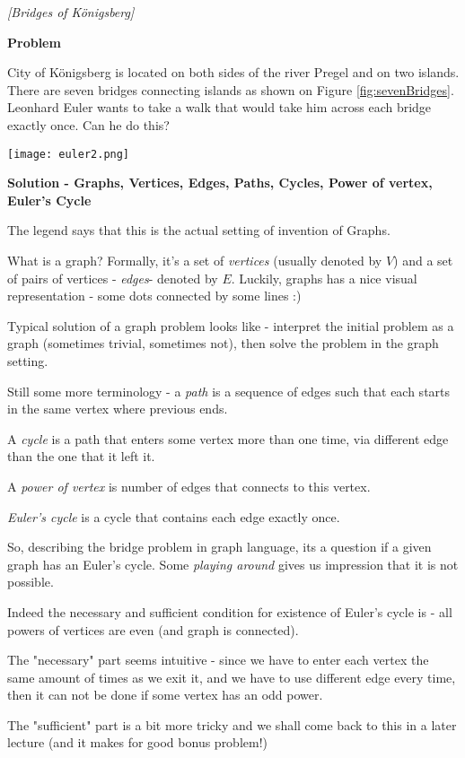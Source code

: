 

%




\noindent 
\filbreak
\begin{problem}
\textit{[Bridges of Königsberg]}

\textbf{Problem}

City of Königsberg is located on both sides of the river Pregel and on two islands. There are seven bridges connecting islands as shown on Figure \ref{fig:sevenBridges}. Leonhard Euler wants to take a walk that would take him across each bridge exactly once. Can he do this? 

\begin{center}
\texttt{[image: euler2.png]}
\label{fig:sevenBridges}
\end{center} 

\textbf{Solution - Graphs, Vertices, Edges, Paths, Cycles, Power of vertex, Euler's Cycle}

The legend says that this is the actual setting of invention of Graphs. 

What is a graph? Formally, it's a set of \textit{vertices} (usually denoted by $V$) and a set of pairs of vertices - \textit{edges}- denoted by $E$. Luckily, graphs has a nice visual representation - some dots connected by some lines :)

Typical solution of a graph problem looks like - interpret the initial problem as a graph (sometimes trivial, sometimes not), then solve the problem in the graph setting. 

Still some more terminology - a \textit{path} is a sequence of edges such that each starts in the same vertex where previous ends. 

A \textit{cycle} is a path that enters some vertex more than one time, via different edge than the one that it left it. 

A \textit{power of vertex} is number of edges that connects to this vertex.  

\textit{Euler's cycle} is a cycle that contains each edge exactly once. 

So, describing the bridge problem in graph language, its a question if a given graph has an Euler's cycle. 
Some \textit{playing around} gives us impression that it is not possible. 

Indeed the necessary and sufficient condition for existence of Euler's cycle is - all powers of vertices are even (and graph is connected). 

The "necessary" part seems intuitive - since we have to enter each vertex the same amount of times as we exit it, and we have to use different edge every time, then it can not be done if some vertex has an odd power.

The "sufficient" part is a bit more tricky and we shall come back to this in a later lecture (and it makes for good bonus problem!) 
\end{problem}
